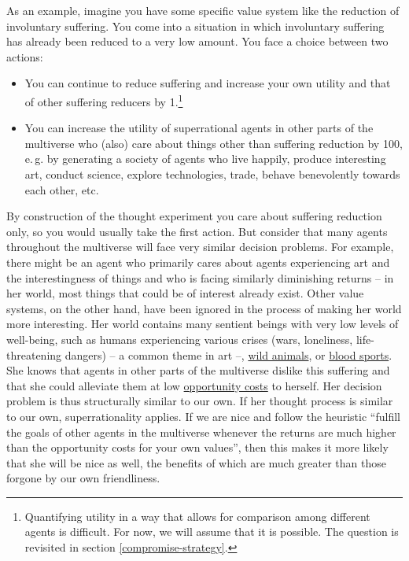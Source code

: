 As an example, imagine you have some specific value system like the
reduction of involuntary suffering. You come into a situation in which
involuntary suffering has already been reduced to a very low amount. You
face a choice between two actions:

\begin{itemize}
\item
  You can continue to reduce suffering and increase your own utility and
  that of other suffering reducers by 1.\footnote{Quantifying utility in
    a way that allows for comparison among different agents is
    difficult. For now, we will assume that it is possible. The question
    is revisited in section
    \ref{compromise-strategy}.}
\item
  You can increase the utility of superrational agents in other parts of
  the multiverse who (also) care about things other than suffering
  reduction by 100, e.\,g. by generating a society of agents who live
  happily, produce interesting art, conduct science, explore
  technologies, trade, behave benevolently towards each other, etc.
\end{itemize}

By construction of the thought experiment you care about suffering
reduction only, so you would usually take the first action. But consider
that many agents throughout the multiverse will face very similar
decision problems. For example, there might be an agent who primarily
cares about agents experiencing art and the interestingness of things
and who is facing similarly diminishing returns -- in her world, most
things that could be of interest already exist. Other value systems, on
the other hand, have been ignored in the process of making her world
more interesting. Her world contains many sentient beings with very low
levels of well-being, such as humans experiencing various crises (wars,
loneliness, life-threatening dangers) -- a common theme in art --,
\href{https://foundational-research.org/the-importance-of-wild-animal-suffering/}{wild
animals}, or
\href{https://en.wikipedia.org/wiki/Blood_sport}{blood sports}.
She knows that agents in other parts of the multiverse dislike this
suffering and that she could alleviate them at low
\href{https://en.wikipedia.org/wiki/Opportunity_cost}{opportunity
costs} to herself. Her decision problem is thus structurally similar to
our own. If her thought process is similar to our own, superrationality
applies. If we are nice and follow the heuristic ``fulfill the goals of
other agents in the multiverse whenever the returns are much higher than
the opportunity costs for your own values'', then this makes it more
likely that she will be nice as well, the benefits of which are much
greater than those forgone by our own friendliness.

